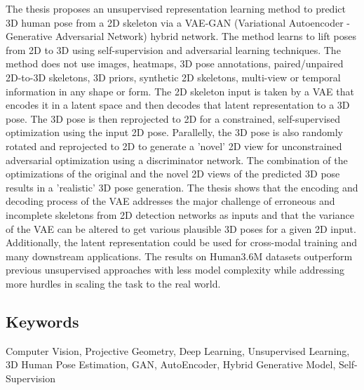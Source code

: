 The thesis proposes an unsupervised representation learning method to predict 3D human pose from a 2D skeleton via a VAE-GAN (Variational Autoencoder - Generative Adversarial Network) hybrid network. The method learns to lift poses from 2D to 3D using self-supervision and adversarial learning techniques. The method does not use images, heatmaps, 3D pose annotations, paired/unpaired 2D-to-3D skeletons, 3D priors, synthetic 2D skeletons, multi-view or temporal information in any shape or form. The 2D skeleton input is taken by a VAE that encodes it in a latent space and then decodes that latent representation to a 3D pose. The 3D pose is then reprojected to 2D for a constrained, self-supervised optimization using the input 2D pose. Parallelly, the 3D pose is also randomly rotated and reprojected to 2D to generate a 'novel' 2D view for unconstrained adversarial optimization using a discriminator network. The combination of the optimizations of the original and the novel 2D views of the predicted 3D pose results in a 'realistic' 3D pose generation. The thesis shows that the encoding and decoding process of the VAE addresses the major challenge of erroneous and incomplete skeletons from 2D detection networks as inputs and that the variance of the VAE can be altered to get various plausible 3D poses for a given 2D input. Additionally, the latent representation could be used for cross-modal training and many downstream applications. The results on Human3.6M datasets outperform previous unsupervised approaches with less model complexity while addressing more hurdles in scaling the task to the real world.


\subsection*{Keywords}
Computer Vision, Projective Geometry, Deep Learning, Unsupervised Learning, 3D Human Pose Estimation, GAN, AutoEncoder, Hybrid Generative Model, Self-Supervision

\newpage
\thispagestyle{plain}
